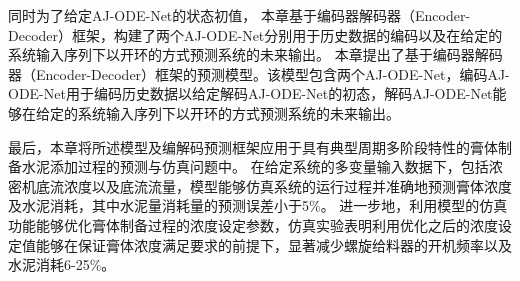 
同时为了给定AJ-ODE-Net的状态初值，
本章基于编码器解码器（Encoder-Decoder）框架，构建了两个AJ-ODE-Net分别用于历史数据的编码以及在给定的系统输入序列下以开环的方式预测系统的未来输出。
本章提出了基于编码器解码器（Encoder-Decoder）框架的预测模型。该模型包含两个AJ-ODE-Net，编码AJ-ODE-Net用于编码历史数据以给定解码AJ-ODE-Net的初态，解码AJ-ODE-Net能够在给定的系统输入序列下以开环的方式预测系统的未来输出。

最后，本章将所述模型及编解码预测框架应用于具有典型周期多阶段特性的膏体制备水泥添加过程的预测与仿真问题中。
在给定系统的多变量输入数据下，包括浓密机底流浓度以及底流流量，模型能够仿真系统的运行过程并准确地预测膏体浓度及水泥消耗，其中水泥量消耗量的预测误差小于5\%。
进一步地，利用模型的仿真功能能够优化膏体制备过程的浓度设定参数，仿真实验表明利用优化之后的浓度设定值能够在保证膏体浓度满足要求的前提下，显著减少螺旋给料器的开机频率以及水泥消耗6-25\%。






